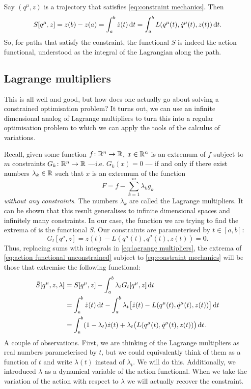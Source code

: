 \documentclass[../main.tex]{subfiles}
\begin{document}
Say \( (q^\mu, z) \) is a trajectory that satisfies \cref{eq:constraint mechanics}. Then 
\begin{equation*}
	S[q^\mu, z] = z(b) - z(a) = \int_a^b \dot{z}(t) \,\mathrm{d} t = \int_a^b L(q^\mu(t),
	\dot{q}^\mu(t), z(t)) \,\mathrm{d} t. 
\end{equation*}
So, for paths that satisfy the constraint, the functional \( S \) is indeed the
action functional, understood as the integral of the Lagrangian along the path.

\subsection{Lagrange multipliers}
This is all well and good, but how does one actually go about solving a constrained
optimisation problem? It turns out, we can use an infinite dimensional analog of Lagrange
multipliers to turn this into a regular optimisation problem to which we can apply the
tools of the calculus of variations. 

Recall, given some function \( f \colon \mathbb{R}^n \to \mathbb{R} \), \( x \in \mathbb{R}^n \) is an extremum of
\( f \) subject to \( m \) constraints \( G_k \colon \mathbb{R}^n \to \mathbb{R} \) ---i.e. \( G_k(x) = 0
\) --- if and only if there exist numbers \( \lambda_k \in \mathbb{R} \) such that
\( x \) is an extremum of the function
\begin{equation} \label{eq:lagrange multipliers}
	 F = f - \sum_{k = 1}^{m}\lambda_k g_k 
\end{equation}
\emph{without any constraints}. The numbers \( \lambda_k \) are called the Lagrange
multipliers. It can be shown that this result generalises to infinite dimensional spaces
and infinitely many constraints. In our case, the function we are trying to find the
extrema of is the functional \( S \). Our constraints are parameterised by \( t \in [a,b]
\):
\begin{equation*}
	G_t[q^\mu, z] = \dot{z}(t) - L(q^\mu(t), \dot{q}^\mu(t), z(t)) = 0.
\end{equation*}
Thus, replacing sums with integrals in \cref{eq:lagrange multipliers}, the extrema of
\cref{eq:action functional unconstrained} subject to \cref{eq:constraint mechanics} will
be those that extremise the following functional: 
\begin{align} \label{eq:lagrange multiplier action}
	\tilde{S}[q^\mu, z, \lambda] & = S[q^\mu, z] - \int_a^b \lambda_t G_t[q^\mu, z] \,\mathrm{d} t
	\nonumber \\
															 & = \int_a^b \dot{z}(t) \,\mathrm{d} t - \int_a^b \lambda_t\big[\dot{z}(t) -
		L(q^\mu(t), \dot{q}^\mu(t), z(t))\big] \,\mathrm{d} t \nonumber \\ & = \int_a^b (1 - \lambda_t)
		\dot{z}(t) + \lambda_t\big(L(q^\mu(t), \dot{q}^\mu(t), z(t))\big) \,\mathrm{d} t.
\end{align}
A couple of observations. First, we are thinking of the Lagrange multipliers as real
numbers parameterised by \( t \), but we could equivalently think of them as a function of
\( t \) and write \( \lambda(t) \) instead of \( \lambda_t \). We will do this.
Additionally, we introduced \( \lambda \) as a dynamical variable of the action
functional. When we take the variation of the action with respect to \( \lambda \) we will
actually recover the constraint. 
\end{document}
